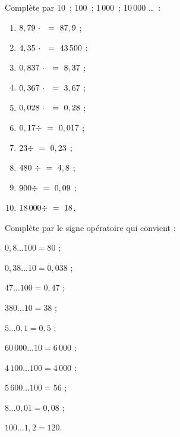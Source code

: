\begin{exercice}
Complète par 10 ; 100 ; 1\,000 ; 10\,000 \ldots :
\begin{enumerate} 
 \item $8,79 \cdot \dotfill = 87,9$ ; 
 
 \item $4,35 \cdot \dotfill = 43\,500$ ; 
 
 \item $0,837 \cdot \dotfill = 8,37$ ; 
 
 \item $0,367 \cdot \dotfill = 3,67$ ; 
 
 \item $0,028 \cdot \dotfill = 0,28$ ; 
 
 \item $0,17 \div \dotfill = 0,017$ ; 
 
 \item $23 \div \dotfill = 0,23$ ; 
 
 \item $480 \div \dotfill = 4,8$ ; 
 
 \item $900 \div \dotfill = 0,09$ ; 
 
 \item \hspace{0.25em}$18\,000 \div \dotfill = 18$. 
 
 \end{enumerate}
\end{exercice}


\begin{exercice}
Complète par le signe opératoire qui convient :
\begin{colenumerate}{2}
 \item $0,8 \ldots 100 = 80$ ;
 \item $0,38 \ldots 10 = 0,038$ ;
 \item $47 \ldots 100 = 0,47$ ;
 \item $380 \ldots 10 = 38$ ;
 \item $5 \ldots 0,1 = 0,5$ ;
 \item $60\,000 \ldots 10 = 6\,000$ ;
 \item $4\,100 \ldots 100 = 4\,000$ ;
 \item $5\,600 \ldots 100 = 56$ ;
 \item $8 \ldots 0,01 = 0,08$ ;
 \item \hspace{0.25em}$100 \ldots 1,2 = 120$.
 \end{colenumerate} 
\end{exercice}


